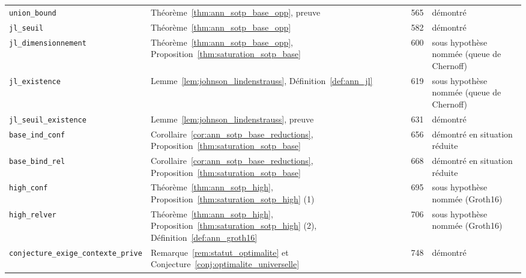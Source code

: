 {\begin{longtable}{@{}p{4.6cm}>{\raggedright\arraybackslash}p{4.9cm}p{0.9cm}>{\raggedright\arraybackslash}p{4cm}@{}}
\texttt{union\_\allowbreak{}bound} & Théorème~\ref{thm:ann_sotp_base_opp}, preuve & 565 & démontré \\
\texttt{jl\_\allowbreak{}seuil} & Théorème~\ref{thm:ann_sotp_base_opp} & 582 & démontré \\
\texttt{jl\_\allowbreak{}dimensionnement} & Théorème~\ref{thm:ann_sotp_base_opp}, Proposition~\ref{thm:saturation_sotp_base} & 600 & sous hypothèse nommée (queue de Chernoff) \\
\texttt{jl\_\allowbreak{}existence} & Lemme~\ref{lem:johnson_lindenstrauss}, Définition~\ref{def:ann_jl} & 619 & sous hypothèse nommée (queue de Chernoff) \\
\texttt{jl\_\allowbreak{}seuil\_\allowbreak{}existence} & Lemme~\ref{lem:johnson_lindenstrauss}, preuve & 631 & démontré \\
\texttt{base\_\allowbreak{}ind\_\allowbreak{}conf} & Corollaire~\ref{cor:ann_sotp_base_reductions}, Proposition~\ref{thm:saturation_sotp_base} & 656 & démontré en situation réduite \\
\texttt{base\_\allowbreak{}bind\_\allowbreak{}rel} & Corollaire~\ref{cor:ann_sotp_base_reductions}, Proposition~\ref{thm:saturation_sotp_base} & 668 & démontré en situation réduite \\
\texttt{high\_\allowbreak{}conf} & Théorème~\ref{thm:ann_sotp_high}, Proposition~\ref{thm:saturation_sotp_high} (1) & 695 & sous hypothèse nommée (Groth16) \\
\texttt{high\_\allowbreak{}relver} & Théorème~\ref{thm:ann_sotp_high}, Proposition~\ref{thm:saturation_sotp_high} (2), Définition~\ref{def:ann_groth16} & 706 & sous hypothèse nommée (Groth16) \\
\texttt{conjecture\_\allowbreak{}exige\_\allowbreak{}contexte\_\allowbreak{}prive} & Remarque~\ref{rem:statut_optimalite} et Conjecture~\ref{conj:optimalite_universelle} & 748 & démontré \\
\end{longtable}
}

